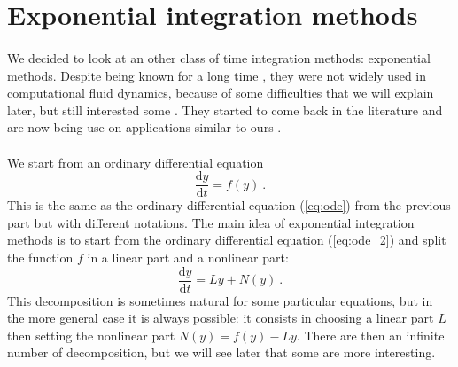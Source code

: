   \section{Exponential integration methods}

    \paragraph{}
    We decided to look at an other class of time integration methods: exponential methods.
    Despite being known for a long time \cite{Pope1963}, they were not widely used in computational fluid dynamics, because of some difficulties that we will explain later, but still interested some \cite{EdwardsTuckermanFriesnerEtAl1994}.
    They started to come back in the literature \cite{HochbruckOstermann2005, HochbruckOstermann2010} and are now being use on applications similar to ours \cite{NieZhangZhao2006, BhattKhaliqWade2018}.

    \paragraph{}
    We start from an ordinary differential equation
    \begin{equation}\label{eq:ode_2}
      \frac{\mathrm{d} y}{\mathrm{d} t} = f\left(y\right) \ .
    \end{equation}
    This is the same as the ordinary differential equation (\ref{eq:ode}) from the previous part but with different notations.
    The main idea of exponential integration methods is to start from the ordinary differential equation (\ref{eq:ode_2}) and split the function $f$ in a linear part and a nonlinear part:
    \begin{equation}
      \frac{\mathrm{d} y}{\mathrm{d} t} = Ly + N\left(y\right) \ .
    \end{equation}
    This decomposition is sometimes natural for some particular equations, but in the more general case it is always possible: it consists in choosing a linear part $L$ then setting the nonlinear part $N\left(y\right) = f(y) - Ly$.
    There are then an infinite number of decomposition, but we will see later that some are more interesting.


